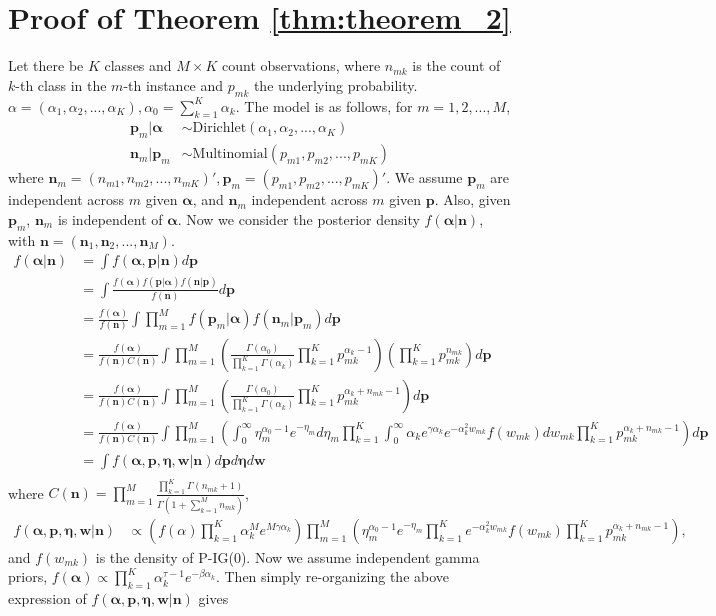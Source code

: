 \documentclass{statsoc}
\newcommand{\p}{\bm{p}}
\newcommand{\w}{\bm{w}}
\newcommand{\eeta}{\bm{\eta}}
\newcommand{\n}{\bm{n}}
\newcommand{\alphavec}{\bm{\alpha}}
\begin{document}
\section{Proof of Theorem \ref{thm:theorem_2}} \label{proof_thm2}
Let there be $K$ classes and $M\times K$ count observations,  where $n_{mk}$ is the count of $k$-th class in the $m$-th instance and $p_{mk}$ the underlying probability. $\alpha = (\alpha_1, \alpha_2, ..., \alpha_K), \alpha_0 = \sum_{k=1}^K \alpha_k$. The model is as follows, for $m=1, 2, ..., M$,
\begin{align*}
\p_m | \alphavec & \sim \text{Dirichlet}(\alpha_1, \alpha_2, ..., \alpha_K)\\
\n_m | \p_m & \sim \text{Multinomial}(p_{m1}, p_{m2}, ..., p_{mK})
\end{align*}
where $\n_m = (n_{m1}, n_{m2}, ..., n_{mK})', \p_m = (p_{m1}, p_{m2}, ..., p_{mK})'$. 
We assume $\p_m$ are independent across $m$ given $\alphavec$, and $\n_m$ independent across $m$ given $\p$. Also, given $\p_m$, $\n_m$ is independent of $\alphavec$. Now we consider the posterior density $f(\alphavec|\n)$, with $\n = (\n_1, \n_2, ..., \n_M)$.
\begin{align*}
f(\alphavec | \n) &= \int f(\alphavec, \p | \n) d\p\\
&= \int \frac{f(\alphavec)f(\p|\alphavec)f(\n|\p)}{f(\n)} d\p \\
&= \frac{f(\alphavec)}{f(\n)} \int \prod_{m=1}^M f(\p_m|\alphavec)f(\n_m|\p_m) d\p\\
&= \frac{f(\alphavec)}{f(\n)C(\n)} \int \prod_{m=1}^M \left(\frac{\Gamma(\alpha_0)}{\prod_{k=1}^K \Gamma(\alpha_k)}\prod_{k=1}^K p_{mk}^{\alpha_k-1} \right)\left(\prod_{k=1}^K p_{mk}^{n_{mk}}\right)   d\p\\
&= \frac{f(\alphavec)}{f(\n)C(\n)} \int \prod_{m=1}^M \left(\frac{\Gamma(\alpha_0)}{\prod_{k=1}^K \Gamma(\alpha_k)}\prod_{k=1}^K p_{mk}^{\alpha_k+n_{mk}-1} \right) d\p\\
&= \frac{f(\alphavec)}{f(\n)C(\n)} \int \prod_{m=1}^M \left(\int_0^\infty \eta_m^{\alpha_0 - 1} e^{-\eta_m} d \eta_m \prod_{k=1}^K \int_0^\infty \alpha_k e^{\gamma\alpha_k} e^{-\alpha_k^2 w_{mk}}f(w_{mk})dw_{mk}\prod_{k=1}^K p_{mk}^{\alpha_k+n_{mk}-1} \right) d\p\\
&=  \int f(\alphavec, \p, \eeta, \w | \n)d\p d\eeta d\w\\
\end{align*}
where $C(\n) = \prod_{m=1}^M \frac{\prod_{k=1}^K \Gamma(n_{mk}+1)}{\Gamma(1 + \sum_{k=1}^M n_{mk})}$,
\begin{align*}
f(\alphavec, \p, \eeta, \w | \n) &\propto \left(f(\alpha) \prod_{k=1}^K \alpha_k^M e^{M\gamma\alpha_k} \right)\prod_{m=1}^M  \left( \eta_m^{\alpha_0 - 1} e^{-\eta_m}  \prod_{k=1}^K   e^{-\alpha_k^2 w_{mk}}f(w_{mk})\prod_{k=1}^K p_{mk}^{\alpha_k+n_{mk}-1} \right), 
\end{align*}
and $f(w_{mk})$ is the density of P-IG(0). 
Now we assume independent gamma priors, $f(\alphavec) \propto \prod_{k=1}^K \alpha_k^{\tau-1}e^{-\beta \alpha_k}$. Then simply re-organizing the above expression of $f(\alphavec, \p, \eeta, \w | \n)$ gives
\end{document}
